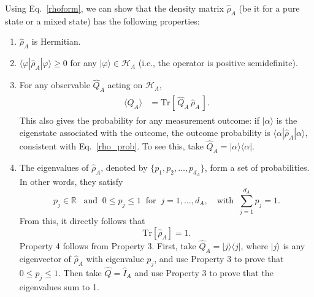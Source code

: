 \documentclass[pra,12pt]{revtex4-2}
\begin{document}
Using Eq.~\eqref{rhoform}, we can show that the density matrix
$\hat{\rho}_A$ (be it for a pure state or a mixed state) has the
following properties:
\begin{enumerate}
\item $\hat{\rho}_A$ is Hermitian.

\item $\langle\varphi|\hat{\rho}_A|\varphi\rangle \ge 0$ for any
  $|\varphi\rangle \in \mathscr{H}_A$ (i.e., the operator is positive
  semidefinite).

\item For any observable $\hat{Q}_A$ acting on $\mathscr{H}_A$,
  \begin{align}
    \begin{aligned}
      \langle Q_A \rangle
      &= \mathrm{Tr}\left[\,\hat{Q}_A \,\hat{\rho}_A\,\right].
    \end{aligned}
    \label{prop3}
  \end{align}
  This also gives the probability for any measurement outcome: if
  $|\alpha\rangle$ is the eigenstate associated with the outcome, the
  outcome probability is $\langle\alpha|\hat\rho_A|\alpha\rangle$,
  consistent with Eq.~\eqref{rho_prob}.  To see this, take $\hat{Q}_A
  = |\alpha\rangle \langle \alpha|$.
  
\item The eigenvalues of $\hat{\rho}_A$, denoted by $\{p_1, p_2,
  \dots, p_{d_A}\}$, form a set of probabilities.  In other words,
  they satisfy
  \begin{equation}
    p_j \in \mathbb{R} \;\;\;\mathrm{and}\;\; 0 \le p_j \le 1 \;\;
    \mathrm{for}\;\; j = 1,\dots,d_A,
    \quad\mathrm{with}\;\; \sum_{j=1}^{d_A} p_j = 1.
    \label{trrho_reduced}    
  \end{equation}
  From this, it directly follows that
  \begin{equation}
    \mathrm{Tr}[\hat\rho_A] = 1.
  \end{equation}
  Property 4 follows from Property 3.  First, take $\hat{Q}_A =
  |j\rangle\langle j|$, where $|j\rangle$ is any eigenvector of
  $\hat\rho_A$ with eigenvalue $p_j$, and use Property 3 to prove that
  $0 \le p_j \le 1$.  Then take $\hat{Q} = \hat{I}_A$ and use Property
  3 to prove that the eigenvalues sum to 1.
\end{enumerate}
\end{document}
